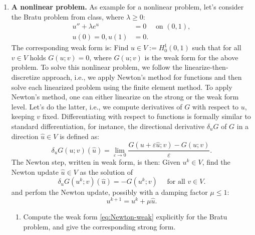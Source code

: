 \documentclass[11pt]{article}
\begin{document}
\begin{enumerate}



\item  {\bf A nonlinear problem.}
  As example for a nonlinear problem, let's consider the Bratu problem
  from class, where $\lambda\ge 0$:
  \begin{align*}
    u'' + \lambda e^u &= 0 \quad \text{ on } (0,1),\\
    u(0) = 0, u(1) &= 0.
  \end{align*}
The corresponding weak form is: Find $u\in V:=H_0^1(0,1)$ such that
for all $v\in V$ holds $G(u;v) = 0$, where $G(u;v)$ is the weak form
for the above problem. To solve this nonlinear problem, we follow the
linearize-then-discretize approach, i.e., we apply Newton's method for
functions and then solve each linearized problem using the finite
element method. To apply Newton's method, one can either linearize on
the strong or the weak form level. Let's do the latter, i.e., we
compute derivatives of $G$ with respect to $u$, keeping $v$ fixed.
Differentiating with respect to functions is formally similar to
standard differentiation, for instance, the directional derivative
$\delta_u G$ of $G$ in a direction $\hat u\in V$ is defined as:
\begin{equation}
 \delta_u G(u;v)(\hat u) = \lim_{\varepsilon \to 0}
 \frac{G(u+\varepsilon \hat u;v) - G(u;v)}{\varepsilon}.
\end{equation}
The Newton step, written in weak form, is then: Given $u^k\in V$, find
the Newton update $\hat u\in V$ as the solution of
\begin{equation}\label{eq:Newton-weak}
\delta_u G(u^k;v)(\hat u) = -G(u^k;v) \quad \text{ for all } v\in V.
\end{equation}
and perfom the Newton update, possibly with a damping factor $\mu\le 1$:
\begin{equation}
u^{k+1} = u^k + \mu \hat u.
\end{equation}
\begin{enumerate}
\item Compute the weak form \eqref{eq:Newton-weak} explicitly for the
  Bratu problem, and
  give the corresponding strong form.\\



\end{enumerate}
\end{enumerate}
\end{document}
